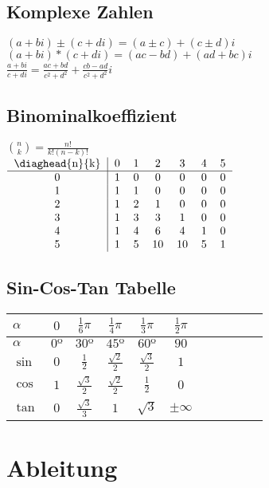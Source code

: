 \documentclass[a4paper, 8pt, landscape]{extarticle}
\begin{document}
\begin{multicols*}{5}
        \subsection{Komplexe Zahlen}
	        $(a + bi) \pm (c + di) = (a \pm c) + (c \pm d)i$\\
	        $(a + bi) * (c + di) = (ac - bd) + (ad + bc)i$\\
	        
            $\displaystyle \frac{a + bi}{c + di} = \frac{ac + bd}{c^2 + d^2} + \frac{cb - ad}{c^2 + d^2}i$
        \subsection{Binominalkoeffizient}
        	$\binom{n}{k}=\frac{n!}{k!(n-k)!}$\\
        	$
        	\begin{tabular}{c | c c c c c c }
        		\diaghead{n}{k} & 0 & 1 & 2 & 3 & 4 & 5\\
        		\hline
        		0 & 1 & 0 & 0 & 0 & 0 & 0\\
        		1 & 1 & 1 & 0 & 0 & 0 & 0\\
        		2 & 1 & 2 & 1 & 0 & 0 & 0\\
        		3 & 1 & 3 & 3 & 1 & 0 & 0\\
        		4 & 1 & 4 & 6 & 4 & 1 & 0\\
        		5 & 1 & 5 & 10 & 10 & 5 & 1\\
        	\end{tabular}
        	$
       	\subsection{Sin-Cos-Tan Tabelle}
        	\begin{tabular}{l c  c  c  c  c  c  c  c  c  c }
        		$\alpha$ & $0$ & $\frac{1}{6}\pi$ & $\frac{1}{4}\pi$ & $\frac{1}{3}\pi$ & $\frac{1}{2}\pi$\\\hline
        		\rowcolor{gray!10}
        		$\alpha$ & $0º$ & $30º$ & $45º$ & $60º$ & $90$\\
        		$\sin$ & $0$ & $\frac{1}{2}$ & $\frac{\sqrt{2}}{2}$ & $\frac{\sqrt{3}}{2}$ & $1$\\
        		\rowcolor{gray!10}
        		$\cos$ & $1$ & $\frac{\sqrt{3}}{2}$ & $\frac{\sqrt{2}}{2}$ & $\frac{1}{2}$ & $0$\\
        		$\tan$ & $0$ & $\frac{\sqrt{3}}{3}$ & $1$ & $\sqrt{3}$ &$\pm\infty$
        	\end{tabular}
    \section{Ableitung}

\end{multicols*}
\end{document}
